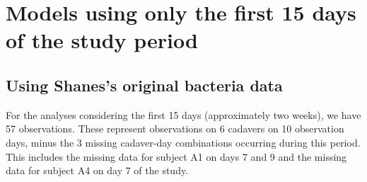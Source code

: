\documentclass{article}
\begin{document}
\section{Models using only the first 15 days of the study period}

\subsection{Using Shanes's original bacteria data}

For the analyses considering the first 15 days (approximately two
weeks), we have 57 observations.  These represent observations on 6
cadavers on 10 observation days, minus the 3 missing cadaver-day
combinations occurring during this period.  This includes the missing
data for subject A1 on days 7 and 9 and the missing data for subject
A4 on day 7 of the study.
\end{document}
